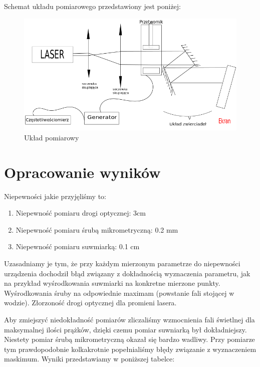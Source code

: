 \documentclass[a4paper,12pt]{article}
\begin{document}
Schemat układu pomiarowego przedstawiony jest poniżej: 

\begin{figure} [H]
  \begin{center}
    \includegraphics[width = 15cm]{Rysunek.png}
    \caption{Układ pomiarowy}
  \end{center}
\end{figure}



\section{Opracowanie wyników}

Niepewności jakie przyjęliśmy to:
\begin{enumerate}
  \item Niepewność pomiaru drogi optycznej: 3cm 
  \item Niepewność pomiaru śrubą mikrometryczną: 0.2 mm 
  \item Niepewność pomiaru suwmiarką: 0.1 cm 
  
\end{enumerate}

Uzasadniamy je tym, że przy każdym mierzonym parametrze do niepewności urządzenia dochodził błąd związany z dokładnością wyznaczenia parametru, jak na przykład wyśrodkowania suwmiarki na konkretne mierzone punkty. Wyśrodkowania śruby na odpowiednie maximam (powstanie fali stojącej w wodzie). Złorzoność drogi optycznej dla promieni lasera. 

Aby zmiejszyć niedokładność pomiarów zliczaliśmy wzmocnienia fali świetlnej dla maksymalnej ilości prążków, dzięki czemu pomiar suwniarką był dokładniejszy. Niestety pomiar śrubą mikrometryczną okazał się bardzo wadliwy. Przy pomiarze tym prawdopodobnie kolkakrotnie popełnialiśmy błędy związanie z wyznaczeniem maskimum. Wyniki przedstawiamy w poniższej tabelce: 
\end{document}
